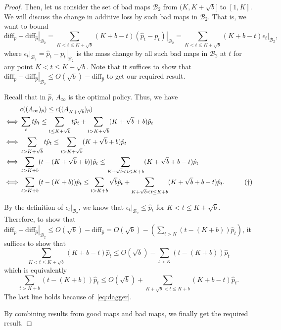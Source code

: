 \begin{proof}
    Then, let us consider the set of bad maps $\mathcal{B}_2$ from $(K,K+\sqrt{b}]$ to $[1,K]$. We will discuss the change in additive loss by such bad maps in $\mathcal{B}_2$. That is, we want to bound 
    $$\left. \text{diff}_p - \text{diff}_{\hat{p}} \right|_{\mathcal{B}_2} = \sum_{K<t \leq K+\sqrt{b}}(K+b-t) \left. (\hat{p}_t - p_t) \right|_{\mathcal{B}_2}= \sum_{K<t \leq K+\sqrt{b}}(K+b-t)\left. \epsilon_t \right|_{\mathcal{B}_2},$$
    where $\left. \epsilon_t \right|_{\mathcal{B}_2} = \left. \hat{p}_t - p_t \right|_{\mathcal{B}_2}$ is the mass change by all such bad maps in $\mathcal{B}_2$ at $t$ for any point $K<t \leq K+\sqrt{b}$. Note that it suffices to show that $\left. \text{diff}_p - \text{diff}_{\hat{p}} \right|_{\mathcal{B}_2} \leq O(\sqrt{b})- \text{diff}_{\hat{p}}$ to get our required result.

    Recall that in $\hat{p}$, $A_\infty$ is the optimal policy. Thus, we have
     \begin{align}
    & c((A_\infty)_{\hat{p}}) \leq c((A_{K+\sqrt{b}})_{\hat{p}}) \notag \\
    \iff & \sum_t t\hat{p}_t \leq \sum_{t \leq K+\sqrt{b}} t\hat{p}_t + \sum_{t>K+\sqrt{b}}(K+\sqrt{b}+b)\hat{p}_t \notag \\
    \iff & \sum_{t > K+\sqrt{b}} t\hat{p}_t \leq \sum_{t>K+\sqrt{b}}(K+\sqrt{b}+b)\hat{p}_t \notag \\
    \iff & \sum_{t > K+b} (t- (K+\sqrt{b}+b))\hat{p}_t \leq \sum_{K+\sqrt{b}<t \leq K+b}(K+\sqrt{b}+b-t)\hat{p}_t \notag \\
    \iff & \sum_{t > K+b} (t- (K+b))\hat{p}_t \leq \sum_{t > K+b}\sqrt{b}\hat{p}_t + \sum_{K+\sqrt{b}<t \leq K+b}(K+\sqrt{b}+b-t)\hat{p}_t. \quad \label{eq:dagger} \tag{\(\dagger\)}
    \end{align}

    By the definition of $\left. \epsilon_t \right|_{\mathcal{B}_2}$, we know that $\left. \epsilon_t \right|_{\mathcal{B}_2} \leq \hat{p}_t$ for $K<t \leq K+\sqrt{b}$. Therefore, to show that $\left. \text{diff}_p - \text{diff}_{\hat{p}} \right|_{\mathcal{B}_2} \leq O(\sqrt{b})- \text{diff}_{\hat{p}} = O(\sqrt{b})- (\sum_{t>K}(t-(K+b))\hat{p}_t)$, it suffices to show that
    \[\sum_{K<t \leq K+\sqrt{b}}(K+b-t)\hat{p}_t \leq O(\sqrt{b})- \sum_{t>K}(t-(K+b))\hat{p}_t\]
    which is equivalently
    \[\sum_{t>K+b} (t-(K+b))\hat{p}_t \leq O(\sqrt{b}) + \sum_{K+\sqrt{b}<t\leq K+b} (K+b-t)\hat{p}_t.\]
    The last line holds because of~\eqref{eq:dagger}.

    By combining results from good maps and bad maps, we finally get the required result.
\end{proof}

